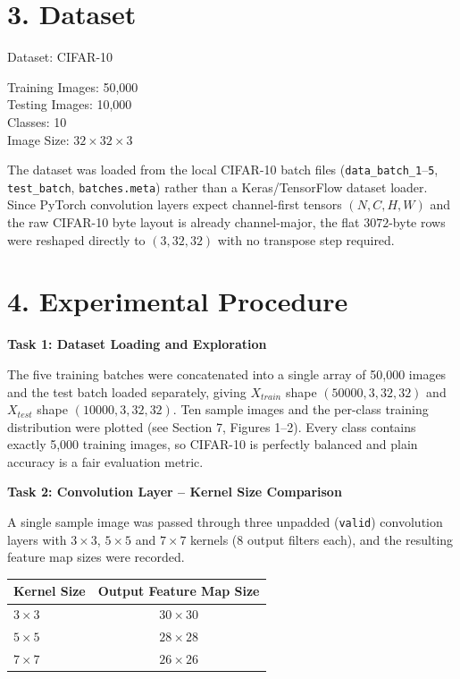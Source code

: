 \documentclass[11pt]{article}
\begin{document}
\section*{3. Dataset}
Dataset: CIFAR-10

Training Images: 50,000 \\
Testing Images: 10,000 \\
Classes: 10 \\
Image Size: $32\times32\times3$

The dataset was loaded from the local CIFAR-10 batch files (\texttt{data\_batch\_1}--\texttt{5}, \texttt{test\_batch}, \texttt{batches.meta}) rather than a Keras/TensorFlow dataset loader. Since PyTorch convolution layers expect channel-first tensors $(N,C,H,W)$ and the raw CIFAR-10 byte layout is already channel-major, the flat $3072$-byte rows were reshaped directly to $(3,32,32)$ with no transpose step required.

\section*{4. Experimental Procedure}

\textbf{Task 1: Dataset Loading and Exploration}

The five training batches were concatenated into a single array of 50,000 images and the test batch loaded separately, giving $X_{train}$ shape $(50000,3,32,32)$ and $X_{test}$ shape $(10000,3,32,32)$. Ten sample images and the per-class training distribution were plotted (see Section 7, Figures 1--2). Every class contains exactly 5,000 training images, so CIFAR-10 is perfectly balanced and plain accuracy is a fair evaluation metric.

\bigskip

\textbf{Task 2: Convolution Layer -- Kernel Size Comparison}

A single sample image was passed through three unpadded (\texttt{valid}) convolution layers with $3\times3$, $5\times5$ and $7\times7$ kernels (8 output filters each), and the resulting feature map sizes were recorded.

\begin{center}
\begin{tabular}{|l|c|}
\hline
Kernel Size & Output Feature Map Size\\
\hline
$3\times3$ & $30\times30$\\
$5\times5$ & $28\times28$\\
$7\times7$ & $26\times26$\\
\hline
\end{tabular}
\end{center}
\end{document}
